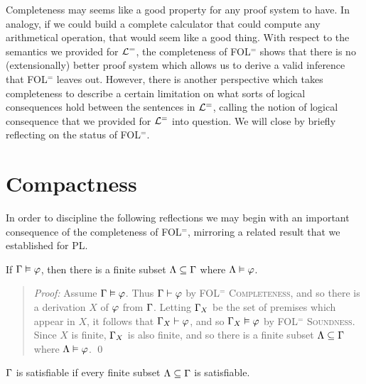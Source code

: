 Completeness may seems like a good property for any proof system to have.
In analogy, if we could build a complete calculator that could compute any arithmetical operation, that would seem like a good thing.
With respect to the semantics we provided for $\mathcal{L}^{=}$, the completeness of FOL$^=$ shows that there is no (extensionally) better proof system which allows us to derive a valid inference that FOL$^=$ leaves out.
However, there is another perspective which takes completeness to describe a certain limitation on what sorts of logical consequences hold between the sentences in $\mathcal{L}^{=}$, calling the notion of logical consequence that we provided for $\mathcal{L}^{=}$ into question.
We will close by briefly reflecting on the status of FOL$^=$. %






\section{Compactness}%
  \label{sec:Compactness}

In order to discipline the following reflections we may begin with an important consequence of the completeness of FOL$^=$, mirroring a related result that we established for PL.

\begin{Cthm} \label{cor:compact}
  If $\Gamma\vDash\varphi$, then there is a finite subset $\Lambda\subseteq\Gamma$ where $\Lambda\vDash\varphi$.
\end{Cthm}

\begin{quote} 
  \textit{Proof:} 
  Assume $\Gamma\vDash\varphi$.  
  Thus $\Gamma\vdash\varphi$ by \textsc{FOL$^=$ Completeness}, and so there is a derivation $X$ of $\varphi$ from $\Gamma$.
  Letting $\Gamma_X$ be the set of premises which appear in $X$, it follows that $\Gamma_X\vdash\varphi$, and so $\Gamma_X\vDash\varphi$ by \textsc{FOL$^=$ Soundness}.
  Since $X$ is finite, $\Gamma_X$ is also finite, and so there is a finite subset $\Lambda\subseteq\Gamma$ where $\Lambda\vDash\varphi$.
  \qed
\end{quote}



\begin{Cthm}[Compactness] \label{cor:compact2}
  $\Gamma$ is satisfiable if every finite subset $\Lambda\subseteq\Gamma$ is satisfiable.
\end{Cthm}

